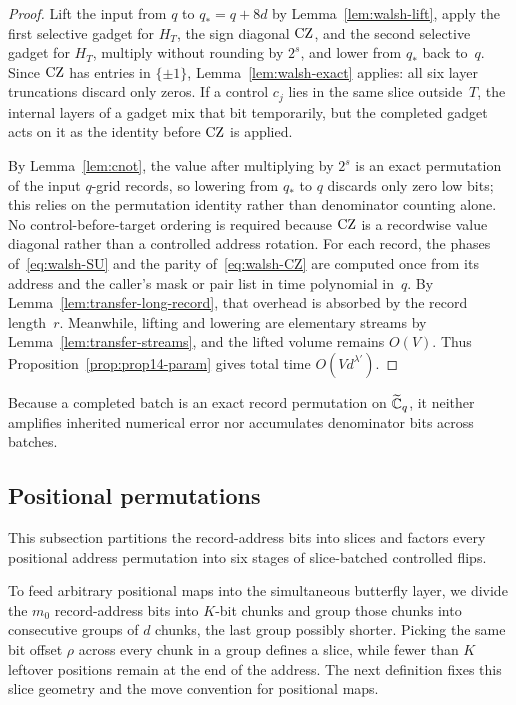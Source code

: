 \begin{proof}
Lift the input from $q$ to $q_*=q+8d$ by Lemma~\ref{lem:walsh-lift}, apply the first selective gadget for $H_T$, the
sign diagonal $\mathrm{CZ}$, and the second selective gadget for $H_T$, multiply without rounding by $2^s$, and lower from $q_*$
back to~$q$. Since $\mathrm{CZ}$ has entries in $\{\pm1\}$, Lemma~\ref{lem:walsh-exact} applies: all six layer truncations
discard only zeros. If a control $c_j$ lies in the same slice outside~$T$, the internal layers of a gadget mix that bit
temporarily, but the completed gadget acts on it as the identity before $\mathrm{CZ}$ is applied.

By Lemma~\ref{lem:cnot}, the value after multiplying by $2^s$ is an exact permutation of the input $q$-grid records, so
lowering from $q_*$ to $q$ discards only zero low bits; this relies on the permutation identity rather than denominator
counting alone. No control-before-target ordering is required because $\mathrm{CZ}$ is a recordwise value diagonal rather than a
controlled address rotation. For each record, the phases of~\eqref{eq:walsh-SU} and the parity of~\eqref{eq:walsh-CZ}
are computed once from its address and the caller's mask or pair list in time polynomial in~$q$. By
Lemma~\ref{lem:transfer-long-record}, that overhead is absorbed by the record length~$r$. Meanwhile, lifting and
lowering are elementary streams by Lemma~\ref{lem:transfer-streams}, and the lifted volume remains $O(V)$. Thus
Proposition~\ref{prop:prop14-param} gives total time $O(Vd^{\lambda'})$.
\end{proof}

Because a completed batch is an exact record permutation on $\widetilde{\mathbb{C}}_q$, it neither amplifies inherited numerical error nor
accumulates denominator bits across batches.

\subsection{Positional permutations}\label{sec:walsh-perm}

This subsection partitions the record-address bits into slices and factors every positional address permutation into six
stages of slice-batched controlled flips.

To feed arbitrary positional maps into the simultaneous butterfly layer, we divide the $m_0$ record-address bits into
$K$-bit chunks and group those chunks into consecutive groups of $d$ chunks, the last group possibly shorter. Picking the same bit offset $\rho$ across every
chunk in a group defines a slice, while fewer than $K$ leftover positions remain at the end of the address. The next
definition fixes this slice geometry and the move convention for positional maps.

